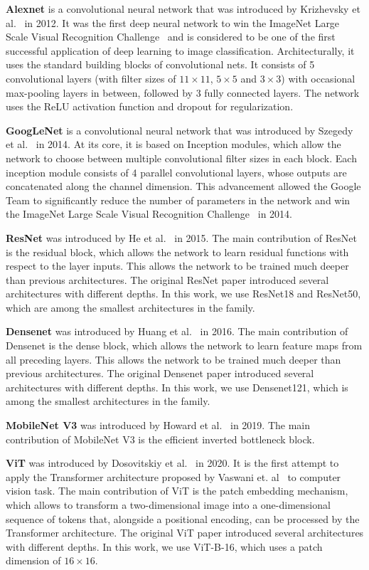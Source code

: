 \documentclass[a4paper]{article}
\begin{document}
\textbf{Alexnet} is a convolutional neural network that was introduced by
Krizhevsky et al.~\cite{alexnet} in 2012. It was the first deep neural network
to win the ImageNet Large Scale Visual Recognition Challenge~\cite{imagenet}
and is considered to be one of the first successful application of deep
learning to image classification. Architecturally, it uses the standard
building blocks of convolutional nets. It consists of 5 convolutional layers
(with filter sizes of $11 \times 11$, $5 \times 5$ and $3 \times 3$) with
occasional max-pooling layers in between, followed by 3 fully connected
layers. The network uses the ReLU activation function and dropout for
regularization.

\textbf{GoogLeNet} is a convolutional neural network that was introduced by
Szegedy et al.~\cite{googlenet} in 2014. At its core, it is based on Inception
modules, which allow the network to choose between multiple convolutional
filter sizes in each block. Each inception module consists of 4 parallel
convolutional layers, whose outputs are concatenated along the channel
dimension. This advancement allowed the Google Team to significantly reduce
the number of parameters in the network and win the ImageNet Large Scale
Visual Recognition Challenge~\cite{imagenet} in 2014.

\textbf{ResNet} was introduced by He et al.~\cite{resnet} in 2015. The main
contribution of ResNet is the residual block, which allows the network to
learn residual functions with respect to the layer inputs. This allows the
network to be trained much deeper than previous architectures. The original
ResNet paper introduced several architectures with different depths. In this
work, we use ResNet18 and ResNet50, which are among the smallest architectures
in the family.

\textbf{Densenet} was introduced by Huang et al.~\cite{densenet} in 2016. The
main contribution of Densenet is the dense block, which allows the network to
learn feature maps from all preceding layers. This allows the network to be
trained much deeper than previous architectures. The original Densenet paper
introduced several architectures with different depths. In this work, we use
Densenet121, which is among the smallest architectures in the family.

\textbf{MobileNet V3} was introduced by Howard et al.~\cite{mobilenetv3} in
2019. The main contribution of MobileNet V3 is the efficient inverted
bottleneck block.

\textbf{ViT} was introduced by Dosovitskiy et al.~\cite{vit} in 2020. It is
the first attempt to apply the Transformer architecture proposed by Vaswani
et. al~\cite{transformer} to computer vision task. The main contribution of
ViT is the patch embedding mechanism, which allows to transform a
two-dimensional image into a one-dimensional sequence of tokens that,
alongside a positional encoding, can be processed by the Transformer
architecture. The original ViT paper introduced several architectures with
different depths. In this work, we use ViT-B-16, which uses a patch dimension
of $16 \times 16$.
\end{document}
